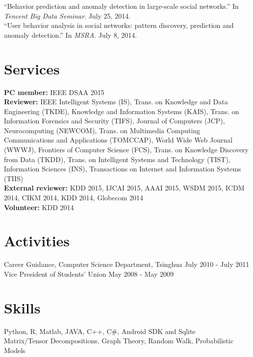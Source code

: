 \documentclass[margin, 10pt]{res} %
\begin{document}
\begin{resume}
``Behavior prediction and anomaly detection in large-scale social networks.'' In {\em Tencent Big Data Seminar}. July 25, 2014. \\
``User behavior analysis in social networks: pattern discovery, prediction and anomaly detection.'' In {\em MSRA}. July 8, 2014.


\section{Services}

{\bf PC member:} IEEE DSAA 2015 \\
{\bf Reviewer:} IEEE Intelligent Systems (IS), Trans. on Knowledge and Data Engineering (TKDE), 
Knowledge and Information Systems (KAIS), Trans. on Information Forensics and Security (TIFS), Journal of Computers (JCP), Neurocomputing (NEWCOM),
Trans. on Multimedia Computing Communications and Applications (TOMCCAP), World Wide Web Journal (WWWJ), Frontiers of Computer Science (FCS),
Trans. on Knowledge Discovery from Data (TKDD), Trans. on Intelligent Systems and Technology (TIST), Information Sciences (INS),
Transactions on Internet and Information Systems (TIIS) \\
{\bf External reviewer:} KDD 2015, IJCAI 2015, AAAI 2015, WSDM 2015, ICDM 2014, CIKM 2014, KDD 2014, Globecom 2014 \\
{\bf Volunteer:} KDD 2014


\section{Activities}

Career Guidance, Computer Science Department, Tsinghua \hfill {July 2010 - July 2011} \\
Vice President of Students' Union \hfill {May 2008 - May 2009}


\section{Skills}

Python, R, Matlab, JAVA, C++, C\#, Android SDK and Sqlite \\
Matrix/Tensor Decompositions, Graph Theory, Random Walk, Probabilistic Models

\end{resume}
\end{document}
